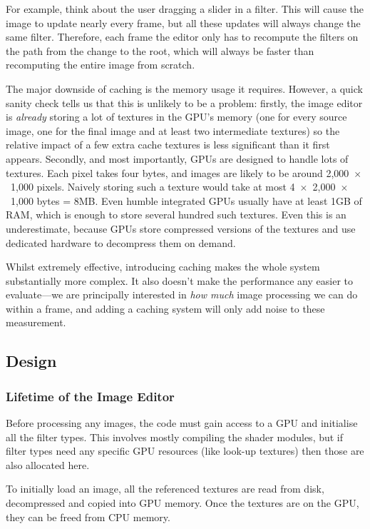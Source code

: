\documentclass[12pt]{article}
\begin{document}
For example, think about the user dragging a slider in a filter.  This will cause the image to
update nearly every frame, but all these updates will always change the same filter.  Therefore,
each frame the editor only has to recompute the filters on the path from the change to the root,
which will always be faster than recomputing the entire image from scratch.

The major downside of caching is the memory usage it requires.  However, a quick sanity check tells
us that this is unlikely to be a problem: firstly, the image editor is \emph{already} storing a lot
of textures in the GPU's memory (one for every source image, one for the final image and at least
two intermediate textures) so the relative impact of a few extra cache textures is less significant
than it first appears.  Secondly, and most importantly, GPUs are designed to handle lots of
textures.  Each pixel takes four bytes, and images are likely to be around 2,000~$\times$~1,000
pixels.  Naively storing such a texture would take at most 4~$\times$~2,000~$\times$~1,000 bytes =
8MB.  Even humble integrated GPUs usually have at least 1GB of RAM, which is enough to store several
hundred such textures.  Even this is an underestimate, because GPUs store compressed versions of the
textures and use dedicated hardware to decompress them on demand.

Whilst extremely effective, introducing caching makes the whole system substantially more complex.
It also doesn't make the performance any easier to evaluate---we are principally interested in
\emph{how much} image processing we can do within a frame, and adding a caching system will only add
noise to these measurement.

\subsection{Design}

\subsubsection{Lifetime of the Image Editor}

Before processing any images, the code must gain access to a GPU and initialise all the filter
types.  This involves mostly compiling the shader modules, but if filter types need any specific GPU
resources (like look-up textures) then those are also allocated here.

To initially load an image, all the referenced textures are read from disk, decompressed and copied
into GPU memory.  Once the textures are on the GPU, they can be freed from CPU memory.
\end{document}
